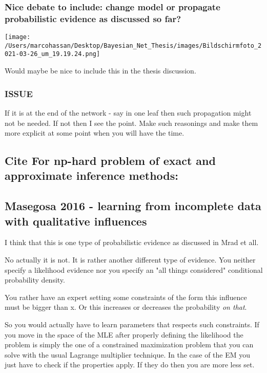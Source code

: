 \documentclass[a4paper]{article}
\begin{document}
\subsubsection{Nice debate to include: change model or propagate probabilistic evidence as discussed so far?}
\label{sec:org18ae87f}

\begin{center}
\texttt{[image: /Users/marcohassan/Desktop/Bayesian\_Net\_Thesis/images/Bildschirmfoto\_2021-03-26\_um\_19.19.24.png]}
\end{center}


Would maybe be nice to include this in the thesis discussion.


\subsubsection{ISSUE}
\label{sec:org926ad6f}

\label{issue_have-still-to-understand-why-propagation-is-necessary}
If it is at the end of the network - say in one leaf then
such propagation might not be needed. If not then I see the
point. Make such reasonings and make them more explicit at some
point when you will have the time.




\subsection{Cite For np-hard problem of exact and approximate inference methods:}
\label{sec:orgf4d0db3}

\cite{Dagum_1993,Cooper_1990}


\subsection{Masegosa 2016 - learning from incomplete data with qualitative influences}
\label{sec:orge9fb8d7}

I think that this is one type of probabilistic evidence as
discussed in Mrad et all.

No actually it is not. It is rather another different type of
evidence. You neither specify a likelihood evidence nor you specify
an "all things considered" conditional probability density.

You rather have an expert setting some constraints of the form this
influence must be bigger than x. Or this increases or decreases the
probability \emph{on that}.

So you would actually have to learn parameters that respects such
constraints. If you move in the space of the MLE after properly
defining the likelihood the problem is simply the one of a
constrained maximization problem that you can solve with the usual
Lagrange multiplier technique. In the case of the EM you just have
to check if the properties apply. If they do then you are more less
set.
\end{document}
